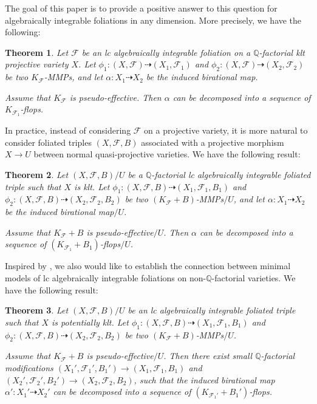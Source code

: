 \documentclass[11pt]{amsart}
\numberwithin{equation}{section}
\newcommand{\Qq}{\mathbb{Q}}
\newcommand{\Ff}{\mathcal{F}}
\newtheorem{thm}{Theorem}[section]
\theoremstyle{definition}
\theoremstyle{definition}
\theoremstyle{definition}
\begin{document}
The goal of this paper is to provide a positive answer to this question for algebraically integrable foliations in any dimension. More precisely, we have the following:


\begin{thm}\label{thm: main}
Let $\Ff$ be an lc algebraically integrable foliation on a $\Qq$-factorial klt projective variety $X$. Let $\phi_1: (X,\Ff)\dashrightarrow (X_1,\Ff_1)$ and $\phi_2: (X,\Ff)\dashrightarrow (X_2,\Ff_2)$ be two $K_{\Ff}$-MMPs, and let $\alpha: X_1\dashrightarrow X_2$ be the induced birational map. 

Assume that $K_{\Ff}$ is pseudo-effective. Then $\alpha$ can be decomposed into a sequence of $K_{\Ff_1}$-flops.
\end{thm}

In practice, instead of considering $\Ff$ on a projective variety, it is more natural to consider foliated triples $(X,\Ff,B)$ associated with a projective morphism  $X\rightarrow U$ between normal quasi-projective varieties. We have the following result:

\begin{thm}\label{thm: main triple}
Let $(X,\Ff,B)/U$ be a $\Qq$-factorial lc algebraically integrable foliated triple such that $X$ is klt. Let $\phi_1: (X,\Ff,B)\dashrightarrow (X_1,\Ff_1,B_1)$ and $\phi_2: (X,\Ff,B)\dashrightarrow (X_2,\Ff_2,B_2)$ be two $(K_{\Ff}+B)$-MMPs$/U$, and let $\alpha: X_1\dashrightarrow X_2$ be the induced birational map$/U$.

Assume that $K_{\Ff}+B$ is pseudo-effective$/U$. Then $\alpha$ can be decomposed into a sequence of $(K_{\Ff_1}+B_1)$-flops$/U$.
\end{thm}

Inspired by \cite[Theorem 1.2]{Has20}, we also would like to establish the connection between minimal models of lc algebraically integrable foliations on non-$\Qq$-factorial varieties. We have the following result:

\begin{thm}\label{thm: main non q factorial}
Let $(X,\Ff,B)/U$ be an lc algebraically integrable foliated triple such that $X$ is potentially klt. Let $\phi_1: (X,\Ff,B)\dashrightarrow (X_1,\Ff_1,B_1)$ and $\phi_2: (X,\Ff,B)\dashrightarrow (X_2,\Ff_2,B_2)$ be two $(K_{\Ff}+B)$-MMPs$/U$. 

Assume that $K_{\Ff}+B$ is pseudo-effective$/U$. Then there exist small $\Qq$-factorial modifications $(X_1',\Ff_1',B_1')\rightarrow (X_1,\Ff_1,B_1)$ and $(X_2',\Ff_2',B_2')\rightarrow (X_2,\Ff_2,B_2)$, such that the induced birational map $\alpha': X_1'\dashrightarrow X_2'$ can be decomposed into a sequence of $(K_{\Ff_1'}+B_1')$-flops.
\end{thm}
\end{document}
